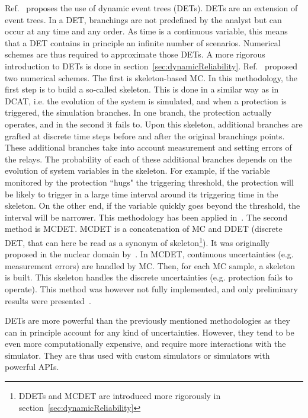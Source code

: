 Ref.~\cite{PierreIEEEtran} proposes the use of dynamic event trees (DETs). DETs are an extension of event trees. In a DET, branchings are not predefined by the analyst but can occur at any time and any order. As time is a continuous variable, this means that a DET contains in principle an infinite number of scenarios. Numerical schemes are thus required to approximate those DETs. A more rigorous introduction to DETs is done in section~\ref{sec:dynamicReliability}. Ref.~\cite{PierreIEEEtran} proposed two numerical schemes. The first is skeleton-based MC. In this methodology, the first step is to build a so-called skeleton. This is done in a similar way as in DCAT, i.e. the evolution of the system is simulated, and when a protection is triggered, the simulation branches. In one branch, the protection actually operates, and in the second it fails to. Upon this skeleton, additional branches are grafted at discrete time steps before and after the original branchings points. These additional branches take into account measurement and setting errors of the relays. The probability of each of these additional branches depends on the evolution of system variables in the skeleton. For example, if the variable monitored by the protection ``hugs" the triggering threshold, the protection will be likely to trigger in a large time interval around its triggering time in the skeleton. On the other end, if the variable quickly goes beyond the threshold, the interval will be narrower. This methodology has been applied in~\cite{Faghihi}. The second method is MCDET. MCDET is a concatenation of MC and DDET (discrete DET, that can here be read as a synonym of skeleton\footnote{DDETs and MCDET are introduced more rigorously in section~\ref{sec:dynamicReliability}}). It was originally proposed in the nuclear domain by~\cite{MCDET}. In MCDET, continuous uncertainties (e.g. measurement errors) are handled by MC. Then, for each MC sample, a skeleton is built. This skeleton handles the discrete uncertainties (e.g. protection fails to operate). This method was however not fully implemented, and only preliminary results were presented~\cite{PierreMCDETprelim}.


DETs are more powerful than the previously mentioned methodologies as they can in principle account for any kind of uncertainties. However, they tend to be even more computationally expensive, and require more interactions with the simulator. They are thus used with custom simulators or simulators with powerful APIs.

